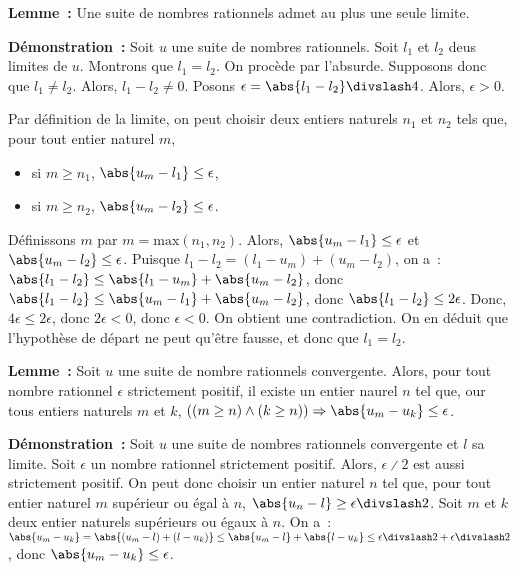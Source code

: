 \medskip

\noindent\textbf{Lemme :} Une suite de nombres rationnels admet au plus une seule limite.

\medskip

\noindent\textbf{Démonstration :} Soit $u$ une suite de nombres rationnels. 
    Soit $l_1$ et $l_2$ deus limites de $u$. 
    Montrons que $l_1 = l_2$. 
    On procède par l'absurde. 
    Supposons donc que $l_1 \neq l_2$.
    Alors, $l_1 - l_2 \neq 0$. 
    Posons $\epsilon = \abs{l_1 - l_2} \divslash 4$. 
    Alors, $\epsilon > 0$.
    
    Par définition de la limite, on peut choisir deux entiers naturels $n_1$ et $n_2$ tels que, pour tout entier naturel $m$,
    \begin{itemize}[nosep]
        \item si $m \geq n_1$, $\abs{u_m - l_1} \leq \epsilon$,
        \item si $m \geq n_2$, $\abs{u_m - l_2} \leq \epsilon$.
    \end{itemize}
    Définissons $m$ par $m = \mathrm{max}(n_1, n_2)$.
    Alors, $\abs{u_m - l_1} \leq \epsilon$ et $\abs{u_m - l_2} \leq \epsilon$.
    Puisque $l_1 - l_2 = (l_1 - u_m) + (u_m - l_2)$, on a : $\abs{l_1 - l_2} \leq \abs{l_1 - u_m} + \abs{u_m - l_2}$, donc $\abs{l_1 - l_2} \leq \abs{u_m - l_1} + \abs{u_m - l_2}$, donc $\abs{l_1 - l_2} \leq 2 \epsilon$.
    Donc, $4 \epsilon \leq 2 \epsilon$, donc $2 \epsilon < 0$, donc $\epsilon < 0$.
    On obtient une contradiction. 
    On en déduit que l'hypothèse de départ ne peut qu'être fausse, et donc que $l_1 = l_2$.

    \done

\medskip

\noindent\textbf{Lemme :} Soit $u$ une suite de nombre rationnels convergente. 
    Alors, pour tout nombre rationnel $\epsilon$ strictement positif, il existe un entier naurel $n$ tel que, our tous entiers naturels $m$ et $k$, $((m \geq n) \wedge (k \geq n)) \Rightarrow \abs{u_m - u_k} \leq \epsilon$.

\medskip

\noindent\textbf{Démonstration :} Soit $u$ une suite de nombres rationnels convergente et $l$ sa limite.
    Soit $\epsilon$ un nombre rationnel strictement positif. 
    Alors, $\epsilon \divslash 2$ est aussi strictement positif.
    On peut donc choisir un entier naturel $n$ tel que, pour tout entier naturel $m$ supérieur ou égal à $n$, $\abs{u_n - l} \geq \epsilon \divslash 2$.
    Soit $m$ et $k$ deux entier naturels supérieurs ou égaux à $n$. 
    On a : $\abs{u_m - u_k} = \abs{(u_m - l) + (l - u_k)} \leq \abs{u_m - l} + \abs{l - u_k} \leq \epsilon \divslash 2 + \epsilon \divslash 2$, donc $\abs{u_m - u_k} \leq \epsilon$. 


